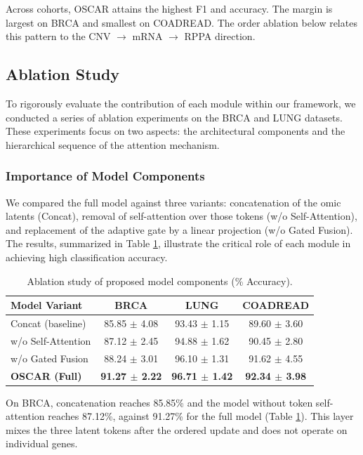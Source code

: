 \documentclass[lettersize,journal]{IEEEtran}
\begin{document}
Across cohorts, OSCAR attains the highest F1 and accuracy. The margin is largest on BRCA and smallest on COADREAD. The order ablation below relates this pattern to the CNV $\rightarrow$ mRNA $\rightarrow$ RPPA direction.

\subsection{Ablation Study}


To rigorously evaluate the contribution of each module within our framework, we conducted a series of ablation experiments on the BRCA and LUNG datasets. These experiments focus on two aspects: the architectural components and the hierarchical sequence of the attention mechanism.

\subsubsection{Importance of Model Components}
We compared the full model against three variants: concatenation of the omic latents (Concat), removal of self-attention over those tokens (w/o Self-Attention), and replacement of the adaptive gate by a linear projection (w/o Gated Fusion). The results, summarized in Table \ref{tab:ablation_components}, illustrate the critical role of each module in achieving high classification accuracy.


\begin{table}[!htbp]
\centering
\small
\caption{Ablation study of proposed model components (\% Accuracy).}
\label{tab:ablation_components}
\begin{tabular}{lccc}
\hline
\textbf{Model Variant} & \textbf{BRCA} & \textbf{LUNG} & \textbf{COADREAD} \\ \hline
Concat (baseline)      & 85.85 $\pm$ 4.08 & 93.43 $\pm$ 1.15 & 89.60 $\pm$ 3.60 \\
w/o Self-Attention     & 87.12 $\pm$ 2.45 & 94.88 $\pm$ 1.62 & 90.45 $\pm$ 2.80 \\
w/o Gated Fusion       & 88.24 $\pm$ 3.01 & 96.10 $\pm$ 1.31 & 91.62 $\pm$ 4.55 \\ \hline
\textbf{OSCAR (Full)} & \textbf{91.27 $\pm$ 2.22} & \textbf{96.71 $\pm$ 1.42} & \textbf{92.34 $\pm$ 3.98} \\ \hline
\end{tabular}
\end{table}

On BRCA, concatenation reaches 85.85\% and the model without token self-attention reaches 87.12\%, against 91.27\% for the full model (Table \ref{tab:ablation_components}). This layer mixes the three latent tokens after the ordered update and does not operate on individual genes. 
\end{document}
